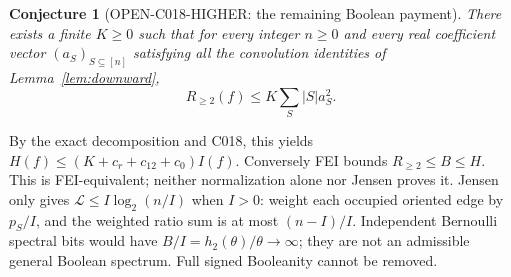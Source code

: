 \documentclass[11pt]{article}
\newtheorem{conjecture}[lemma]{Conjecture}
\begin{document}
\begin{conjecture}[OPEN-C018-HIGHER: the remaining Boolean payment]
\label{conj:universal}
There exists a finite $K\ge0$ such that for every integer $n\ge0$
and every real coefficient vector $(a_S)_{S\subseteq[n]}$ satisfying
all the convolution identities of Lemma~\ref{lem:downward},
\[
R_{\ge2}(f)\le K\sum_S|S|a_S^2.
\]
\end{conjecture}
By the exact decomposition and C018, this yields
$H(f)\le(K+c_r+c_{12}+c_0)I(f)$.
Conversely FEI bounds $R_{\ge2}\le B\le H$.
This is FEI-equivalent; neither normalization alone nor Jensen
proves it. Jensen only gives
$\mathcal L\le I\log_2(n/I)$ when $I>0$: weight each occupied
oriented edge by $p_S/I$, and the weighted ratio sum is at most
$(n-I)/I$. Independent Bernoulli spectral bits would have
$B/I=h_2(\theta)/\theta\to\infty$; they are not an admissible
general Boolean spectrum. Full signed Booleanity cannot be removed.
\end{document}
